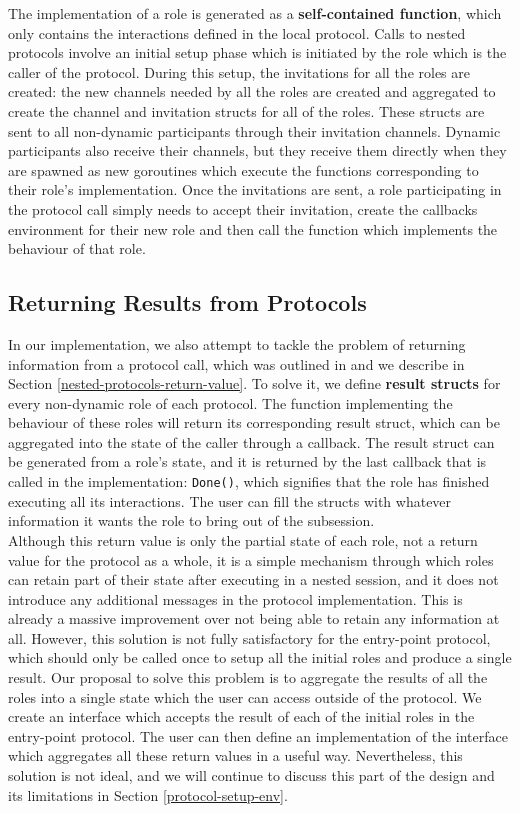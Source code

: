 \documentclass[12pt,twoside]{report}
\begin{document}
The implementation of a role is generated as a \textbf{self-contained function}, which only contains the interactions defined in the local protocol. Calls to nested protocols involve an initial setup phase which is initiated by the role which is the caller of the protocol. During this setup, the invitations for all the roles are created: the new channels needed by all the roles are created and aggregated to create the channel and invitation structs for all of the roles. These structs are sent to all non-dynamic participants through their invitation channels. Dynamic participants also receive their channels, but they receive them directly when they are spawned as new goroutines which execute the functions corresponding to their role's implementation. Once the invitations are sent, a role participating in the protocol call simply needs to accept their invitation, create the callbacks environment for their new role and then call the function which implements the behaviour of that role.

\subsection{Returning Results from Protocols}

In our implementation, we also attempt to tackle the problem of returning information from a protocol call, which was outlined in \cite{nestedprotocols} and we describe in Section \ref{nested-protocols-return-value}. To solve it, we define \textbf{result structs} for every non-dynamic role of each protocol. The function implementing the behaviour of these roles will return its corresponding result struct, which can be aggregated into the state of the caller through a callback. The result struct can be generated from a role's state, and it is returned by the last callback that is called in the implementation: \texttt{Done()}, which signifies that the role has finished executing all its interactions. The user can fill the structs with whatever information it wants the role to bring out of the subsession.\\

Although this return value is only the partial state of each role, not a return value for the protocol as a whole, it is a simple mechanism through which roles can retain part of their state after executing in a nested session, and it does not introduce any additional messages in the protocol implementation. This is already a massive improvement over not being able to retain any information at all. However, this solution is not fully satisfactory for the entry-point protocol, which should only be called once to setup all the initial roles and produce a single result. Our proposal to solve this problem is to aggregate the results of all the roles into a single state which the user can access outside of the protocol. We create an interface which accepts the result of each of the initial roles in the entry-point protocol. The user can then define an implementation of the interface which aggregates all these return values in a useful way. Nevertheless, this solution is not ideal, and we will continue to discuss this part of the design and its limitations in Section \ref{protocol-setup-env}.
\end{document}
